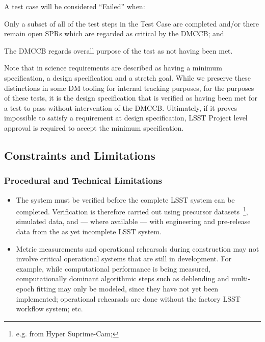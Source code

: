 A test case will be considered ``Failed'' when:

\begin{itemize_single}
\item{Only a subset of all of the test steps in the Test Case are completed and/or there remain open SPRs which are regarded as critical by the DMCCB; and}
\item{The DMCCB regards overall purpose of the test as not having been met.}
\end{itemize_single}

Note that in  science requirements are described as having a minimum specification, a design specification and a stretch goal.
While we preserve these distinctions in some DM tooling for internal tracking purposes, for the purposes of these tests, it is the design specification that is verified as having been met for a test to pass without intervention of the DMCCB.
Ultimately, if it proves impossible to satisfy a requirement at design specification, LSST Project level approval is required to accept the minimum specification.

\subsection{Constraints and Limitations}

\subsubsection{Procedural and Technical Limitations}

\begin{itemize}


  \item{The \product{} system must be verified before the complete LSST system can be completed. Verification is therefore carried out using precursor datasets~\footnote{e.g. from Hyper Suprime-Cam; }, simulated data, and --- where available --- with engineering and pre-release data from the as yet incomplete LSST system.}

  \item{Metric measurements and operational rehearsals during construction may not involve critical operational systems that are still in development. For example, while computational performance is being measured, computationally dominant algorithmic steps such as deblending and multi-epoch fitting may only be modeled, since they have not yet been implemented; operational rehearsals are done without the factory LSST workflow system; etc.}

\end{itemize}

